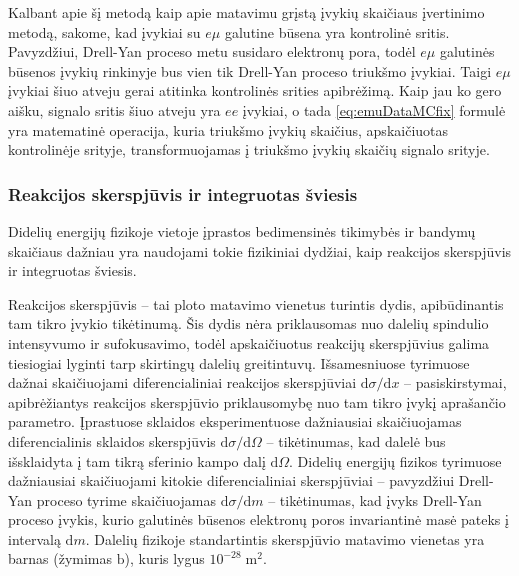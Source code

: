 \documentclass[a4paper, 12pt]{article}
\newlength\q
\begin{document}
Kalbant apie šį metodą kaip apie matavimu grįstą įvykių skaičiaus įvertinimo metodą, sakome, kad įvykiai su $e\mu$ galutine būsena yra kontrolinė sritis. Pavyzdžiui, Drell-Yan proceso metu susidaro elektronų pora, todėl $e\mu$ galutinės būsenos įvykių rinkinyje bus vien tik Drell-Yan proceso triukšmo įvykiai. Taigi $e\mu$ įvykiai šiuo atveju gerai atitinka kontrolinės srities apibrėžimą. Kaip jau ko gero aišku, signalo sritis šiuo atveju yra $ee$ įvykiai, o tada \eqref{eq:emuDataMCfix} formulė yra matematinė operacija, kuria triukšmo įvykių skaičius, apskaičiuotas kontrolinėje srityje, transformuojamas į triukšmo įvykių skaičių signalo srityje.

\subsubsection{Reakcijos skerspjūvis ir integruotas šviesis}

Didelių energijų fizikoje vietoje įprastos bedimensinės tikimybės ir bandymų skaičiaus dažniau yra naudojami tokie fizikiniai dydžiai, kaip reakcijos skerspjūvis ir integruotas šviesis.

Reakcijos skerspjūvis -- tai ploto matavimo vienetus turintis dydis, apibūdinantis tam tikro įvykio tikėtinumą. Šis dydis nėra priklausomas nuo dalelių spindulio intensyvumo ir sufokusavimo, todėl apskaičiuotus reakcijų skerspjūvius galima tiesiogiai lyginti tarp skirtingų dalelių greitintuvų. Išsamesniuose tyrimuose dažnai skaičiuojami diferencialiniai reakcijos skerspjūviai $\mathrm{d}\sigma/\mathrm{d}x$ -- pasiskirstymai, apibrėžiantys reakcijos skerspjūvio priklausomybę nuo tam tikro įvykį aprašančio parametro. Įprastuose sklaidos eksperimentuose dažniausiai skaičiuojamas diferencialinis sklaidos skerspjūvis $\mathrm{d}\sigma/\mathrm{d}\Omega$ -- tikėtinumas, kad dalelė bus išsklaidyta į tam tikrą sferinio kampo dalį $\mathrm{d}\Omega$. Didelių energijų fizikos tyrimuose dažniausiai skaičiuojami kitokie diferencialiniai skerspjūviai -- pavyzdžiui Drell-Yan proceso tyrime skaičiuojamas $\mathrm{d}\sigma/\mathrm{d}m$ -- tikėtinumas, kad įvyks Drell-Yan proceso įvykis, kurio galutinės būsenos elektronų poros invariantinė masė pateks į intervalą $\mathrm{d}m$. Dalelių fizikoje standartintis skerspjūvio matavimo vienetas yra barnas (žymimas $\mathrm{b}$), kuris lygus $10^{-28}\;\mathrm{m}^{2}$.
\end{document}
